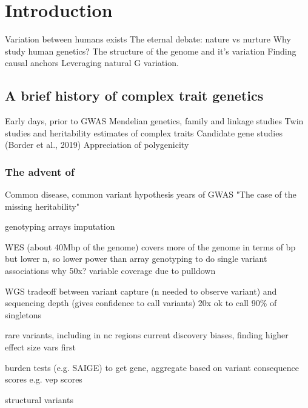 %
%

\chapter{Introduction}

\begin{outline}
    \1 Variation between humans exists
    \1 The eternal debate: nature vs nurture
    \1 Why study human genetics?
    \1 The structure of the genome and it's variation
    \1 Finding causal anchors
    \1 Leveraging natural G variation.
\end{outline}

\section{A brief history of complex trait genetics}

\begin{outline}
    \1 Early days, prior to GWAS
    \1 Mendelian genetics, family and linkage studies
    \1 Twin studies and heritability estimates of complex traits
    \1 Candidate gene studies (Border et al., 2019)
    \1 Appreciation of polygenicity
\end{outline}

\subsection{The advent of }

\begin{outline}

    \1 Common disease, common variant hypothesis
     years of GWAS
    \1 "The case of the missing heritability"

    \1 genotyping arrays
        \2 imputation

    \1 WES (about 40Mbp of the genome)
        \2 covers more of the genome in terms of bp
        \2 but lower n, so lower power than array genotyping to do single variant associations
        \2 why 50x? variable coverage due to pulldown 

    \1 WGS
        \2 tradeoff between variant capture (n needed to observe variant) and sequencing depth (gives confidence to call variants)
        \2 20x ok to call 90\% of singletons

        \2 rare variants, including in nc regions
            \3 current discovery biases, finding higher effect size vars first

            \3 burden tests (e.g. SAIGE)
                \4 to get gene, aggregate based on variant consequence scores e.g. vep scores

        \2 structural variants

\end{outline}

